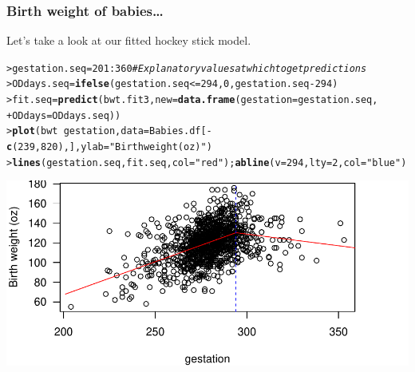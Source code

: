 \documentclass{beamer}\usepackage[]{graphicx}\usepackage[]{xcolor}
\makeatletter
\def\maxwidth{ %
  \ifdim\Gin@nat@width>\linewidth
    \linewidth
  \else
    \Gin@nat@width
  \fi
}
\newcommand{\hlnum}[1]{\textcolor[rgb]{0.686,0.059,0.569}{#1}}%
\newcommand{\hlstr}[1]{\textcolor[rgb]{0.192,0.494,0.8}{#1}}%
\newcommand{\hlcom}[1]{\textcolor[rgb]{0.678,0.584,0.686}{\textit{#1}}}%
\newcommand{\hlopt}[1]{\textcolor[rgb]{0,0,0}{#1}}%
\newcommand{\hlstd}[1]{\textcolor[rgb]{0.345,0.345,0.345}{#1}}%
\newcommand{\hlkwb}[1]{\textcolor[rgb]{0.69,0.353,0.396}{#1}}%
\newcommand{\hlkwc}[1]{\textcolor[rgb]{0.333,0.667,0.333}{#1}}%
\newcommand{\hlkwd}[1]{\textcolor[rgb]{0.737,0.353,0.396}{\textbf{#1}}}%
\newenvironment{kframe}{%
 \def\at@end@of@kframe{}%
 \ifinner\ifhmode%
  \def\at@end@of@kframe{\end{minipage}}%
  \begin{minipage}{\columnwidth}%
 \fi\fi%
 \def\FrameCommand##1{\hskip\@totalleftmargin \hskip-\fboxsep
 \colorbox{shadecolor}{##1}\hskip-\fboxsep
     \hskip-\linewidth \hskip-\@totalleftmargin \hskip\columnwidth}%
 \MakeFramed {\advance\hsize-\width
   \@totalleftmargin\z@ \linewidth\hsize
   \@setminipage}}%
 {\par\unskip\endMakeFramed%
 \at@end@of@kframe}
\newenvironment{knitrout}{}{} %
\makeatother
\begin{document}
\begin{frame}[fragile]
\frametitle{Birth weight of babies\ldots}
Let's take a look at our fitted hockey stick model.

\begin{knitrout}\scriptsize
{}\color{fgcolor}\begin{kframe}
\begin{alltt}
\hlstd{> }\hlstd{gestation.seq}\hlkwb{=}\hlnum{201}\hlopt{:}\hlnum{360} \hlcom{#Explanatory values at which to get predictions}
\hlstd{> }\hlstd{ODdays.seq}\hlkwb{=}\hlkwd{ifelse}\hlstd{(gestation.seq}\hlopt{<=}\hlnum{294}\hlstd{,}\hlnum{0}\hlstd{,gestation.seq}\hlopt{-}\hlnum{294}\hlstd{)}
\hlstd{> }\hlstd{fit.seq}\hlkwb{=}\hlkwd{predict}\hlstd{(bwt.fit3,}\hlkwc{new}\hlstd{=}\hlkwd{data.frame}\hlstd{(}\hlkwc{gestation}\hlstd{=gestation.seq,}
\hlstd{+ }                                        \hlkwc{ODdays}\hlstd{=ODdays.seq))}
\hlstd{> }\hlkwd{plot}\hlstd{(bwt}\hlopt{~}\hlstd{gestation,}\hlkwc{data}\hlstd{=Babies.df[}\hlopt{-}\hlkwd{c}\hlstd{(}\hlnum{239}\hlstd{,} \hlnum{820}\hlstd{),],}\hlkwc{ylab}\hlstd{=}\hlstr{"Birth weight (oz)"}\hlstd{)}
\hlstd{> }\hlkwd{lines}\hlstd{(gestation.seq,fit.seq,}\hlkwc{col}\hlstd{=}\hlstr{"red"}\hlstd{);} \hlkwd{abline}\hlstd{(}\hlkwc{v}\hlstd{=}\hlnum{294}\hlstd{,}\hlkwc{lty}\hlstd{=}\hlnum{2}\hlstd{,}\hlkwc{col}\hlstd{=}\hlstr{"blue"}\hlstd{)}
\end{alltt}
\end{kframe}
\includegraphics[width=\maxwidth]{figure/RC-H10-030_5-1} 
\end{knitrout}
\end{frame}
\end{document}
